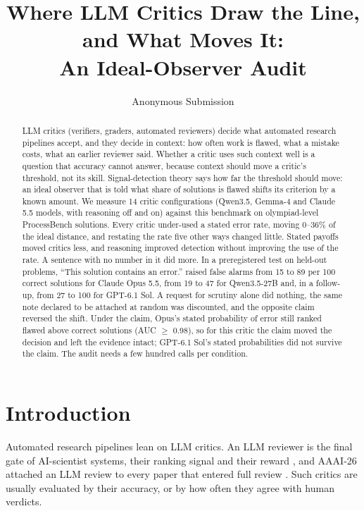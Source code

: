 \documentclass[letterpaper]{article} %
\title{Where LLM Critics Draw the Line, and What Moves It:\\An Ideal-Observer Audit}
\author{Anonymous Submission}
\begin{document}
\maketitle

\begin{abstract}
LLM critics (verifiers, graders, automated reviewers) decide what automated research pipelines accept, and they decide in context: how often work is flawed, what a mistake costs, what an earlier reviewer said. Whether a critic uses such context well is a question that accuracy cannot answer, because context should move a critic's threshold, not its skill. Signal-detection theory says how far the threshold should move: an ideal observer that is told what share of solutions is flawed shifts its criterion by a known amount. We measure 14 critic configurations (Qwen3.5, Gemma-4 and Claude 5.5 models, with reasoning off and on) against this benchmark on olympiad-level ProcessBench solutions. Every critic under-used a stated error rate, moving 0--36\% of the ideal distance, and restating the rate five other ways changed little. Stated payoffs moved critics less, and reasoning improved detection without improving the use of the rate. A sentence with no number in it did more. In a preregistered test on held-out problems, ``This solution contains an error.'' raised false alarms from 15 to 89 per 100 correct solutions for Claude Opus 5.5, from 19 to 47 for Qwen3.5-27B and, in a follow-up, from 27 to 100 for GPT-6.1 Sol. A request for scrutiny alone did nothing, the same note declared to be attached at random was discounted, and the opposite claim reversed the shift. Under the claim, Opus's stated probability of error still ranked flawed above correct solutions (AUC $\geq$ 0.98), so for this critic the claim moved the decision and left the evidence intact; GPT-6.1 Sol's stated probabilities did not survive the claim. The audit needs a few hundred calls per condition.
\end{abstract}

\section{Introduction}

Automated research pipelines lean on LLM critics. An LLM reviewer is the final gate of AI-scientist systems, their ranking signal and their reward \citep{lu2024aiscientist,yamada2025aiscientistv2,weng2025cycleresearcher}, and AAAI-26 attached an LLM review to every paper that entered full review \citep{biswas2026aaai}. Such critics are usually evaluated by their accuracy, or by how often they agree with human verdicts.
\end{document}

